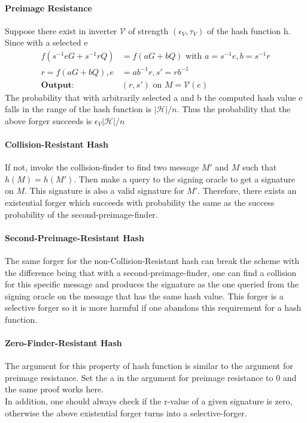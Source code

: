 \documentclass[18]{article}
\begin{document}
\paragraph{Preimage Resistance}
Suppose there exist in inverter $\mathscr{V}$ of strength $(\epsilon_V, \tau_V)$ of the hash function h. Since with a selected e
\begin{align*}
f(s^{-1}eG+s^{-1}rQ) &= f(aG+bQ) \text{ with } a=s^{-1}e, b=s^{-1}r \\
r=f(aG+bQ), e&=ab^{-1}r,  s\prime = rb^{-1}\\
\textbf{Output: }&(r,s\prime) \text{ on } M=\mathscr{V}(e)
\end{align*}
The probability that with arbitrarily selected a and b the computed hash value e falls in the range of the hash function is $|\mathscr{H}|/n$. Thus the probability that the above forger succeeds is $\epsilon_V|\mathscr{H}|/n$
\paragraph{Collision-Resistant Hash}
If not, invoke the collision-finder to find two message $M'$ and $M$ such that $h(M)=h(M')$. Then make a query to the signing oracle to get a signature on $M$. This signature is also a valid signature for $M'$. Therefore, there exists an existential forger which succeeds with probability the same as the success probability of the second-preimage-finder.
\paragraph{Second-Preimage-Resistant Hash}
The same forger for the non-Collision-Resistant hash can break the scheme with the difference being that with a second-preimage-finder, one can find a collision for this specific message and produces the signature as the one queried from the signing oracle on the message that has the same hash value.
This forger is a selective forger so it is more harmful if one abandons this requirement for a hash function.
\paragraph{Zero-Finder-Resistant Hash} The argument for this property of hash function is similar to the argument for preimage resistance. Set the a in the argument for preimage resistance to 0 and the same proof works here.\\

In addition, one should always check if the r-value of a given signature is zero, otherwise the above existential forger turns into a selective-forger.
\end{document}

